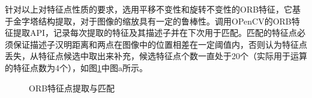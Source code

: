 \documentclass[fontset=fandol,type=bachelor,campus=harbin]{hithesisbook}
\begin{document}
针对以上对特征点性质的要求，选用平移不变性和旋转不变性的ORB特征，它基于金字塔结构提取，对于图像的缩放具有一定的鲁棒性。调用OPenCV的ORB特征提取API，记录每次提取的特征及其描述子并在下次用于匹配。匹配的特征点必须保证描述子汉明距离和两点在图像中的位置相差在一定阈值内，否则认为特征点丢失，从特征点候选中取出来补充，候选特征点个数一直处于20个（实际用于运算的特征点数为4个），如图\ref{ORB特征点提取与匹配}中图a所示。
\begin{figure}[h]
	\centering
	\caption{ORB特征点提取与匹配}
	\label{ORB特征点提取与匹配}
\end{figure}
\end{document}

